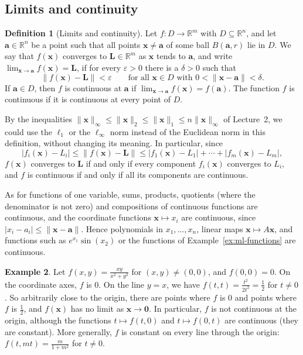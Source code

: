 \documentclass[11pt]{article}
\newcommand{\norm}[1]{\lVert #1 \rVert}
\theoremstyle{definition}
\newtheorem{definition}{Definition}[section]
\newtheorem{example}[definition]{Example}
\theoremstyle{plain}
\theoremstyle{remark}
\begin{document}
\subsection{Limits and continuity}

\begin{definition}[Limits and continuity]\label{def:limit}
    Let $f: D \to \mathbb{R}^m$ with $D \subseteq \mathbb{R}^n$, and let $\mathbf{a} \in \mathbb{R}^n$ be a point such that all points $\mathbf{x} \neq \mathbf{a}$ of some ball $B(\mathbf{a}, r)$ lie in $D$. We say that $f(\mathbf{x})$ converges to $\mathbf{L} \in \mathbb{R}^m$ as $\mathbf{x}$ tends to $\mathbf{a}$, and write $\lim_{\mathbf{x} \to \mathbf{a}} f(\mathbf{x}) = \mathbf{L}$, if for every $\varepsilon > 0$ there is a $\delta > 0$ such that
    \[\norm{f(\mathbf{x}) - \mathbf{L}} < \varepsilon \qquad \text{for all } \mathbf{x} \in D \text{ with } 0 < \norm{\mathbf{x} - \mathbf{a}} < \delta.\]
    If $\mathbf{a} \in D$, then $f$ is continuous at $\mathbf{a}$ if $\lim_{\mathbf{x} \to \mathbf{a}} f(\mathbf{x}) = f(\mathbf{a})$. The function $f$ is continuous if it is continuous at every point of $D$.
\end{definition}

By the inequalities $\norm{\mathbf{x}}_\infty \leq \norm{\mathbf{x}}_2 \leq \norm{\mathbf{x}}_1 \leq n \norm{\mathbf{x}}_\infty$ of Lecture~2, we could use the $\ell_1$ or the $\ell_\infty$ norm instead of the Euclidean norm in this definition, without changing its meaning. In particular, since
\[|f_i(\mathbf{x}) - L_i| \leq \norm{f(\mathbf{x}) - \mathbf{L}} \leq |f_1(\mathbf{x}) - L_1| + \cdots + |f_m(\mathbf{x}) - L_m|,\]
$f(\mathbf{x})$ converges to $\mathbf{L}$ if and only if every component $f_i(\mathbf{x})$ converges to $L_i$, and $f$ is continuous if and only if all its components are continuous.

As for functions of one variable, sums, products, quotients (where the denominator is not zero) and compositions of continuous functions are continuous, and the coordinate functions $\mathbf{x} \mapsto x_i$ are continuous, since $|x_i - a_i| \leq \norm{\mathbf{x} - \mathbf{a}}$. Hence polynomials in $x_1, \ldots, x_n$, linear maps $\mathbf{x} \mapsto A\mathbf{x}$, and functions such as $e^{x_1} \sin(x_2)$ or the functions of Example~\ref{ex:ml-functions} are continuous.

\begin{example}\label{ex:xy}
    Let $f(x, y) = \frac{xy}{x^2 + y^2}$ for $(x, y) \neq (0, 0)$, and $f(0, 0) = 0$. On the coordinate axes, $f$ is $0$. On the line $y = x$, we have $f(t, t) = \frac{t^2}{2t^2} = \frac{1}{2}$ for $t \neq 0$. So arbitrarily close to the origin, there are points where $f$ is $0$ and points where $f$ is $\frac{1}{2}$, and $f(\mathbf{x})$ has no limit as $\mathbf{x} \to \mathbf{0}$. In particular, $f$ is not continuous at the origin, although the functions $t \mapsto f(t, 0)$ and $t \mapsto f(0, t)$ are continuous (they are constant). More generally, $f$ is constant on every line through the origin: $f(t, mt) = \frac{m}{1 + m^2}$ for $t \neq 0$.
\end{example}
\end{document}
